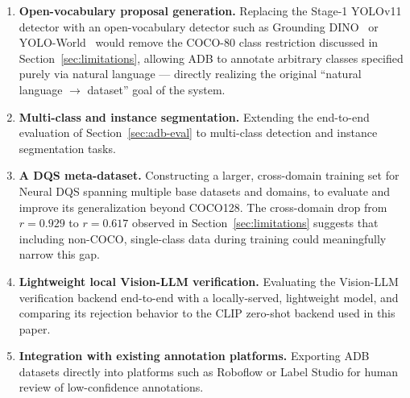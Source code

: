 \documentclass[11pt]{article}
\begin{document}
\begin{enumerate}
\item \textbf{Open-vocabulary proposal generation.} Replacing the Stage-1
  YOLOv11 detector with an open-vocabulary detector such as Grounding
  DINO~\citep{liu2023grounding} or YOLO-World~\citep{cheng2024yoloworld}
  would remove the COCO-80 class restriction discussed in
  Section~\ref{sec:limitations}, allowing ADB to annotate arbitrary classes
  specified purely via natural language --- directly realizing the original
  ``natural language $\to$ dataset'' goal of the system.
\item \textbf{Multi-class and instance segmentation.} Extending the
  end-to-end evaluation of Section~\ref{sec:adb-eval} to multi-class
  detection and instance segmentation tasks.
\item \textbf{A DQS meta-dataset.} Constructing a larger, cross-domain
  training set for Neural DQS spanning multiple base datasets and domains, to
  evaluate and improve its generalization beyond COCO128. The cross-domain
  drop from $r=0.929$ to $r=0.617$ observed in
  Section~\ref{sec:limitations} suggests that including non-COCO,
  single-class data during training could meaningfully narrow this gap.
\item \textbf{Lightweight local Vision-LLM verification.} Evaluating the
  Vision-LLM verification backend end-to-end with a locally-served,
  lightweight model, and comparing its rejection behavior to the CLIP
  zero-shot backend used in this paper.
\item \textbf{Integration with existing annotation platforms.} Exporting ADB
  datasets directly into platforms such as Roboflow or Label Studio for
  human review of low-confidence annotations.
\end{enumerate}



\end{document}
